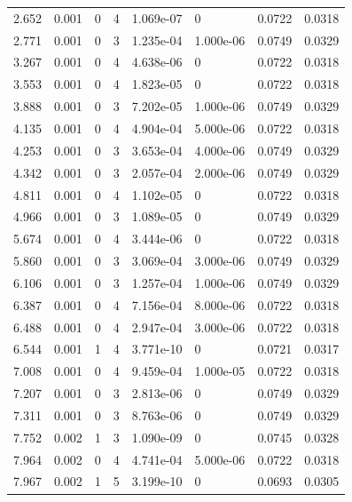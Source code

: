 \documentclass[preview]{standalone}
\begin{document}
{{\begin{tabular}{L{1.2cm}C{1.2cm} C{0.3cm}C{0.5cm} C{1.4cm}C{1.4cm} C{1.4cm}C{1.4cm}}
  2.652  &  0.001  & 0     &  4 &  1.069e-07  & 0  & 0.0722 &  0.0318   \\ 
  2.771  &  0.001  & 0     &  3 &  1.235e-04  & 1.000e-06  & 0.0749 &  0.0329   \\ 
  3.267  &  0.001  & 0     &  4 &  4.638e-06  & 0  & 0.0722 &  0.0318   \\ 
  3.553  &  0.001  & 0     &  4 &  1.823e-05  & 0  & 0.0722 &  0.0318   \\ 
  3.888  &  0.001  & 0     &  3 &  7.202e-05  & 1.000e-06  & 0.0749 &  0.0329   \\ 
  4.135  &  0.001  & 0     &  4 &  4.904e-04  & 5.000e-06  & 0.0722 &  0.0318   \\ 
  4.253  &  0.001  & 0     &  3 &  3.653e-04  & 4.000e-06  & 0.0749 &  0.0329   \\ 
  4.342  &  0.001  & 0     &  3 &  2.057e-04  & 2.000e-06  & 0.0749 &  0.0329   \\ 
  4.811  &  0.001  & 0     &  4 &  1.102e-05  & 0  & 0.0722 &  0.0318   \\ 
  4.966  &  0.001  & 0     &  3 &  1.089e-05  & 0  & 0.0749 &  0.0329   \\ 
  5.674  &  0.001  & 0     &  4 &  3.444e-06  & 0  & 0.0722 &  0.0318   \\ 
  5.860  &  0.001  & 0     &  3 &  3.069e-04  & 3.000e-06  & 0.0749 &  0.0329   \\ 
  6.106  &  0.001  & 0     &  3 &  1.257e-04  & 1.000e-06  & 0.0749 &  0.0329   \\ 
  6.387  &  0.001  & 0     &  4 &  7.156e-04  & 8.000e-06  & 0.0722 &  0.0318   \\ 
  6.488  &  0.001  & 0     &  4 &  2.947e-04  & 3.000e-06  & 0.0722 &  0.0318   \\ 
  6.544  &  0.001  & 1     &  4 &  3.771e-10  & 0  & 0.0721 &  0.0317   \\ 
  7.008  &  0.001  & 0     &  4 &  9.459e-04  & 1.000e-05  & 0.0722 &  0.0318   \\ 
  7.207  &  0.001  & 0     &  3 &  2.813e-06  & 0  & 0.0749 &  0.0329   \\ 
  7.311  &  0.001  & 0     &  3 &  8.763e-06  & 0  & 0.0749 &  0.0329   \\ 
  7.752  &  0.002  & 1     &  3 &  1.090e-09  & 0  & 0.0745 &  0.0328   \\ 
  7.964  &  0.002  & 0     &  4 &  4.741e-04  & 5.000e-06  & 0.0722 &  0.0318   \\ 
  7.967  &  0.002  & 1     &  5 &  3.199e-10  & 0  & 0.0693 &  0.0305   \\ 

\end{tabular}}}
\end{document}

